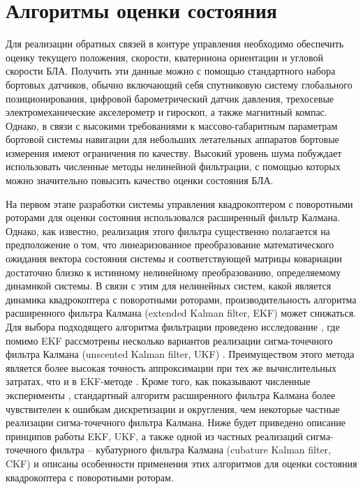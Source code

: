 
\chapter{Алгоритмы оценки состояния}
\label{chapter_estimation}

Для реализации обратных связей в контуре управления необходимо обеспечить оценку текущего положения, скорости, кватерниона ориентации и угловой скорости БЛА. Получить эти данные можно с помощью стандартного набора бортовых датчиков, обычно включающий себя спутниковую систему глобального позиционирования, цифровой барометрический датчик давления, трехосевые электромеханические акселерометр и гироскоп, а также магнитный компас. Однако, в связи с высокими требованиями к массово-габаритным параметрам бортовой системы навигации для небольших летательных аппаратов бортовые измерения имеют ограничения по качеству. Высокий уровень шума побуждает использовать численные методы нелинейной фильтрации, с помощью которых можно значительно повысить качество оценки состояния БЛА.

На первом этапе разработки системы управления квадрокоптером с поворотными роторами для оценки состояния использовался расширенный фильтр Калмана. Однако, как известно, реализация этого фильтра существенно полагается на предположение о том, что линеаризованное преобразование математического ожидания вектора состояния системы и соответствующей матрицы ковариации достаточно близко к истинному нелинейному преобразованию, определяемому динамикой системы. В связи с этим для нелинейных систем, какой является динамика квадрокоптера с поворотными роторами, производительность алгоритма расширенного фильтра Калмана (extended Kalman filter, EKF) может снижаться.
Для выбора подходящего алгоритма фильтрации проведено исследование \cite{Shavin02}, где помимо EKF рассмотрены несколько вариантов реализации сигма-точечного фильтра Калмана (unscented Kalman filter, UKF) \cite{Julier01, Julier02}. Преимуществом этого метода является более высокая точность аппроксимации при тех же вычислительных затратах, что и в EKF-методе \cite{Kulikova01}. Кроме того, как показывают численные эксперименты \cite{Shavin01}, стандартный алгоритм расширенного фильтра Калмана более чувствителен к ошибкам дискретизации и округления, чем некоторые частные реализации сигма-точечного фильтра Калмана. Ниже будет приведено описание принципов работы EKF, UKF, а также одной из частных реализаций сигма-точечного фильтра -- кубатурного фильтра Калмана (cubature Kalman filter, CKF) и описаны особенности применения этих алгоритмов для оценки состояния квадрокоптера с поворотными роторам.


